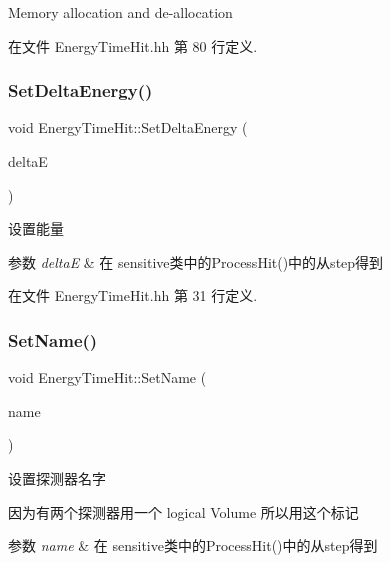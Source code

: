Memory allocation and de-\/allocation 



在文件 Energy\+Time\+Hit.\+hh 第 80 行定义.

\mbox{\label{classEnergyTimeHit_ab7a9602285c51cf42566382df8277147}} 
\subsubsection{\texorpdfstring{Set\+Delta\+Energy()}{SetDeltaEnergy()}}
{\footnotesize\ttfamily void Energy\+Time\+Hit\+::\+Set\+Delta\+Energy (\begin{DoxyParamCaption}\item[{G4double}]{deltaE }\end{DoxyParamCaption})\hspace{0.3cm}{\ttfamily [inline]}}



设置能量 


\begin{DoxyParams}{参数}
{\em deltaE} & 在 sensitive类中的\+Process\+Hit()中的从step得到 \\
\hline
\end{DoxyParams}


在文件 Energy\+Time\+Hit.\+hh 第 31 行定义.

\mbox{\label{classEnergyTimeHit_aadf608ec3e5d06c9735546b29a0f92b4}} 
\subsubsection{\texorpdfstring{Set\+Name()}{SetName()}}
{\footnotesize\ttfamily void Energy\+Time\+Hit\+::\+Set\+Name (\begin{DoxyParamCaption}\item[{G4\+String}]{name }\end{DoxyParamCaption})\hspace{0.3cm}{\ttfamily [inline]}}



设置探测器名字 

因为有两个探测器用一个 logical Volume 所以用这个标记 
\begin{DoxyParams}{参数}
{\em name} & 在 sensitive类中的\+Process\+Hit()中的从step得到 \\
\hline
\end{DoxyParams}


